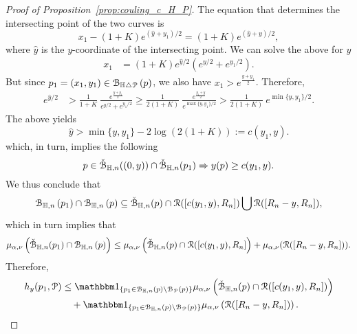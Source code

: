 \begin{proof}[Proof of Proposition~\ref{prop:couling_c_H_P}]
The equation that determines the intersecting point of the two curves is
\[
	x_1 - (1+K)e^{(\hat{y} + y_1)/2}= (1+K) e^{(\hat{y} + y)/2},
\]
where $\hat{y}$ is the $y$-coordinate of the intersecting point. 
We can solve the above for $\hat{y}$  
\begin{equation*} 
\begin{split}
x_1 &=(1+K) e^{\hat{y}/2} \left( e^{y/2} + e^{y_1/2} \right).
\end{split}
\end{equation*}
But since $p_1=(x_1,y_1)  \in {\mathcal B}_{\mathbb{H} \bigtriangleup {\mathcal P}}\left(p\right)$, we also have $x_1 > e^{\frac{y + y_1}{2}}$. Therefore, 
\begin{equation*}
\begin{split}
 e^{\hat{y}/2}& > \frac{1}{1+K}~\frac{e^{\frac{y + y_1}{2}}}{ e^{y/2}+ e^{y_1/2}} \geq 
\frac{1}{2(1+K)}~\frac{e^{\frac{y_1 + y}{2}}}{ e^{\max \{y, y_1\} /2}} 
> \frac{1}{2(1 + K)} ~ e^{\min\{y, y_1\}/2}. 
 \end{split}
\end{equation*}
The above yields
\begin{equation} \label{eq:to_use_I}
\hat{y} > \min\{y, y_1\} - 2\log(2(1+K)) := c(y_1, y). 
\end{equation}
which, in turn, implies the following 
\begin{equation}\label{eq:intersex_approx}
	p \in \check{{\mathcal B}}_{\mathbb{H},n}((0,y))\cap \check{{\mathcal B}}_{\mathbb{H},n}(p_1) \Rightarrow y(p) \ge c(y_1,y).
\end{equation}
We thus conclude that 
\[ 
	{\mathcal B}_{\mathbb{H},n}\left(p_1\right) \cap {\mathcal B}_{\mathbb{H},n}\left(p\right) \subseteq \check{{\mathcal B}}_{\mathbb{H},n}(p) \cap {\mathcal R}([c(y_1,y), R_n]) 
	\bigcup {\mathcal R} ([R_n - y,R_n]),
\]
which in turn implies that
\[
	\mu_{\alpha,\nu} \left( \check{{\mathcal B}}_{\mathbb{H},n}(p_1) \cap {\mathcal B}_{\mathbb{H},n}\left(p\right) \right) \leq 
	\mu_{\alpha,\nu}\left( \check{{\mathcal B}}_{\mathbb{H},n}(p) \cap  {\mathcal R}([c(y_1,y), R_n]\right) + 
	\mu_{\alpha,\nu} ({\mathcal R} ([R_n - y, R_n]) ).
\]
Therefore, 
\begin{align} 
	h_y(p_1, \Pcal) &\leq \ind{p_1 \in \BallHyp{p}\setminus \BallPo{p}} 
    	\mu_{\alpha,\nu}  \left( \FatBallHyp{p} \cap  \Rcal([c(y_1,y), R_n])\right)
        \label{eq:h_upper_bound_1}\\
	&\hspace{10pt}+ \ind{p_1 \in \BallHyp{p}\setminus \BallPo{p}}
    	\mu_{\alpha,\nu}  \left( \Rcal ([R_n - y, R_n]) \right). \label{eq:h_upper_bound_2}
\end{align}


\end{proof}
